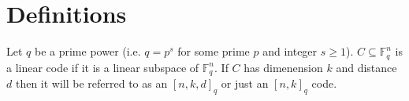 \section{Definitions}
\begin{definition}
Let $q$ be a prime power (i.e. $q = p^{s}$ for some prime $p$ and integer $s \geq 1$).
$C \subseteq \mathbb{F}^{n}_{q}$ is a linear code if it is a linear subspace of $\mathbb{F}^{n}_{q}$.
If $C$ has dimenension $k$ and distance $d$ then it will be referred to as an $[n,k,d]_{q}$ or just an $[n,k]_{q}$ code.
\end{definition}

